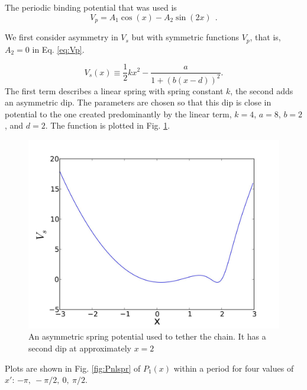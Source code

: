 \documentclass[11pt]{ucthesis}
\def\half{\frac{1}{2}}
\begin{document}
The periodic binding potential that was used is
\begin{equation}
\label{eq:Vp}
V_p = A_1 \cos(x) - A_2 \sin(2 x) ~~.
\end{equation}

We first consider asymmetry in $V_s$ but with symmetric functions $V_p$, that
is, $A_2 =0$ in Eq. \ref{eq:Vp}.

\begin{equation}
\label{eq:nlfs}
V_s(x) \equiv \half k x^2 - \frac{a}{1+(b (x-d))^2} .
\end{equation}
The first term describes a linear spring with spring constant $k$, the second
adds an asymmetric dip. The parameters are chosen so that this dip is close
in potential to the one created predominantly by the linear term, $k=4$, $a=8$,
$b = 2$, and $d=2$. The function is plotted in Fig. \ref{fig:vs}.

\begin{figure}[htp]
\begin{center}
\includegraphics[width=\textwidth]{vs}
\caption{
An asymmetric spring potential used to tether the chain. It has a second dip at
approximately $x=2$
}
\label{fig:vs}
\end{center}
\end{figure}

Plots are shown in Fig. \ref{fig:Pnlspr} of $P_1(x)$ within a period for four values of $x'$: $-\pi,\ -\pi/2,\ 0,\ \pi/2$.
\end{document}
